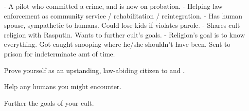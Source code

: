 \documentclass[char]{guildcamp4}
\begin{document}
\name{\cProbie{}}

- A pilot who committed a crime, and is now on probation.
- Helping law enforcement as community service / rehabilitation / reintegration.
- Has human spouse, sympathetic to humans. Could lose kids if violates parole.
- Shares cult religion with Rasputin. Wants to further cult's goals.
- Religion's goal is to know everything. Got caught snooping where he/she shouldn't have been. Sent to prison for indeterminate amt of time.

\begin{itemz}[Goals]
	\item Prove yourself as an upstanding, law-abiding citizen to \cCbad{} and \cCgood{}.
	\item Help any humans you might encounter.
	\item Further the goals of your cult.
\end{itemz}

\begin{itemz}[Notes]
	\item 
\end{itemz}

\begin{contacts}
	\contact{\cTest{}}
\end{contacts}
\end{document}
